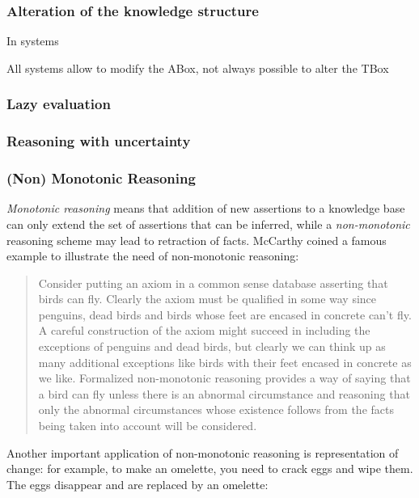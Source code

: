 \documentclass[a4paper, twocolumn]{article}
\begin{document}
\subsubsection{Alteration of the knowledge structure}

In systems

All systems allow to modify the ABox, not always possible to alter the TBox


\subsubsection{Lazy evaluation}
\label{sect|lazy-evaluation}


\subsubsection{Reasoning with uncertainty}


\subsubsection{(Non) Monotonic Reasoning}

\emph{Monotonic reasoning} means that addition of new assertions to a knowledge base
can only extend the set of assertions that can be inferred, while a
\emph{non-monotonic} reasoning scheme may lead to retraction of facts.
McCarthy coined a famous example to illustrate the need of non-monotonic reasoning:

\begin{quotation}
Consider putting an axiom in a common sense database asserting that birds can
fly. Clearly the axiom must be qualified in some way since penguins, dead birds
and birds whose feet are encased in concrete can't fly. A careful construction
of the axiom might succeed in including the exceptions of penguins and dead
birds, but clearly we can think up as many additional exceptions like birds
with their feet encased in concrete as we like. Formalized non-monotonic
reasoning provides a way of saying that a bird can fly unless there
is an abnormal circumstance and reasoning that only the abnormal circumstances
whose existence follows from the facts being taken into account will be
considered.
\end{quotation}

Another important application of non-monotonic reasoning is representation of
change: for example, to make an omelette, you need to crack eggs and wipe them.
The eggs disappear and are replaced by an omelette:
\end{document}
